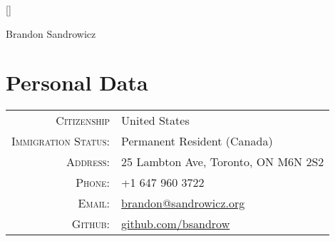 {%

{%

    \usepackage{marvosym}
    \usepackage{url,parskip}
    \usepackage{xunicode,xltxtra}

    \RequirePackage{color,graphicx}
    \usepackage[usenames,dvipsnames]{xcolor}
    \usepackage[big]{layaureo}          %

    \usepackage{titlesec}               %

    \usepackage{hyperref}
    \hypersetup{colorlinks,breaklinks,urlcolor=linkcolour, linkcolor=linkcolour}

    \usepackage{fontspec}
    \setmainfont[SmallCapsFont = Fontin SmallCaps]{Fontin}

    \titleformat{\section}{\Large\scshape\raggedright}{}{0em}{}[\titlerule]
    \titlespacing{\section}{0pt}{5pt}{5pt}
{%

{%
    \pagestyle{empty} %

    \par{\centering
        {\Huge Brandon Sandrowicz }
        \bigskip\par}

    \section{Personal Data}
    \begin{tabular}{rl}
    \textsc{Citizenship}                    & United States\\
    \textsc{Immigration Status:}            & Permanent Resident (Canada)\\
    \textsc{Address:}                       & 25 Lambton Ave, Toronto, ON M6N 2S2\\
    \textsc{Phone:}                         & +1 647 960 3722\\
    \textsc{Email:}                         & \href{mailto:brandon@sandrowicz.org}{brandon@sandrowicz.org}\\
    \textsc{Github:}                        & \href{http://github.com/bsandrow}{github.com/bsandrow}\\
    \end{tabular}

}}}}
